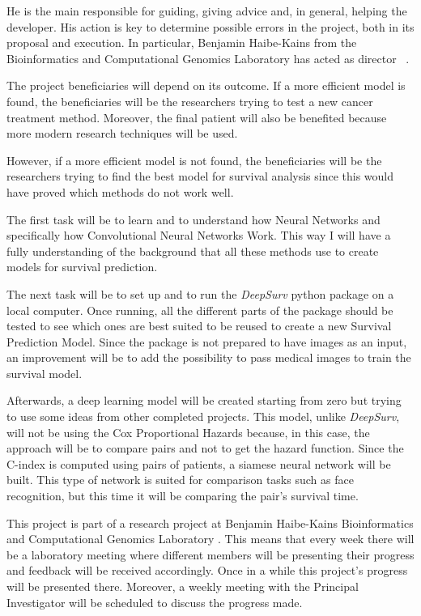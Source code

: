 He is the main responsible for guiding, giving advice and, in general, helping the developer.
His action is key to determine possible errors in the project, both in its proposal and 
execution. In particular, Benjamin Haibe-Kains from the Bioinformatics and Computational
Genomics Laboratory has acted as director
~\cites{bhklab}.

The project beneficiaries will depend on its outcome. If a more efficient model is found, the
beneficiaries will be the researchers trying to test a new cancer treatment method. Moreover,
the final patient will also be benefited because more modern research techniques will be used.

However, if a more efficient model is not found, the beneficiaries will be the researchers
trying to find the best model for survival analysis since this would have proved which 
methods do not work well.


The first task will be to learn and to understand how Neural Networks and specifically how 
Convolutional Neural Networks Work. This way I will have a fully understanding of the background
that all these methods use to create models for survival prediction.

The next task will be to set up and to run the \emph{DeepSurv} python package on a local
computer. Once running, all the different parts of the package should be tested to see which
ones are best suited to be reused to create a new Survival Prediction Model. Since the package
is not prepared to have images as an input, an improvement will be to add the possibility to 
pass medical images to train the survival model.
\cite{medical:deep-surv-github}

Afterwards, a deep learning model will be created starting from zero but trying to use 
some ideas from other completed projects. This model, unlike \emph{DeepSurv}, will not be 
using the Cox Proportional Hazards because, in this case, the approach will be to compare
pairs and not to get the hazard function. Since the C-index is computed using pairs of patients, 
a siamese neural network will be built. This type of network is suited for comparison 
tasks such as face recognition, but this time it will be comparing the pair's survival time.


This project is part of a research project at Benjamin Haibe-Kains Bioinformatics and 
Computational Genomics Laboratory \cite{bhklab}. This means that every week there will be a 
laboratory meeting where different members will be presenting their progress and feedback will
be received accordingly. Once in a while this project's progress will be presented there.
Moreover, a weekly meeting with the Principal Investigator will be scheduled to discuss
the progress made.

